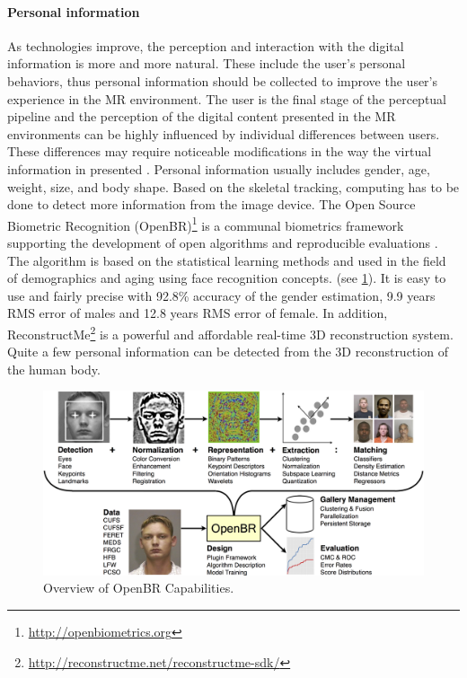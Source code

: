 \paragraph{Personal information} %
As technologies improve, the perception and interaction with the digital information is more and more natural. These include the user's personal behaviors, thus personal information should be collected to improve the user's experience in the MR environment.
The user is the final stage of the perceptual pipeline and the perception of the digital content presented in the MR environments can be highly influenced by individual differences between users. 
These differences may require noticeable modifications in the way the virtual information in presented \cite{Kruijff2010}.
Personal information usually includes gender, age, weight, size, and body shape. 
Based on the skeletal tracking, computing has to be done to detect more information from the image device. 
The Open Source Biometric Recognition (OpenBR)\footnote{\url{http://openbiometrics.org}} is a communal biometrics framework supporting the development of open algorithms and reproducible evaluations \cite{Klontz2013}. 
The algorithm is based on the statistical learning methods and used in the field of demographics and aging using face recognition concepts. (see \figurename{\ref{fig:2:OpenBR}}). It is easy to use and fairly precise with 92.8\% accuracy of the gender estimation, 9.9 years RMS error of males and 12.8 years RMS error of female. In addition, ReconstructMe\footnote{\url{http://reconstructme.net/reconstructme-sdk/}} is a powerful and affordable real-time 3D reconstruction system. Quite a few personal information can be detected from the 3D reconstruction of the human body.
\begin{figure}
	\centering
	\includegraphics[width=0.7\linewidth]{figures/3-PRMM/OpenBR.png}
	\caption[OpenBR]{Overview of OpenBR Capabilities.}
	\label{fig:2:OpenBR}
\end{figure}

